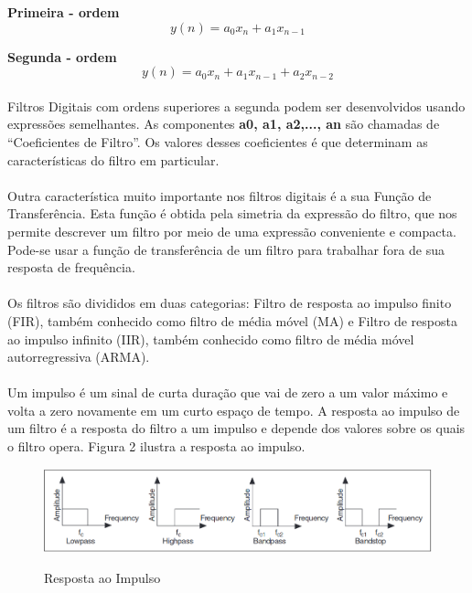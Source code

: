 \documentclass[12pt,fleqn]{article}
\begin{document}
\textbf{Primeira - ordem}
\begin{equation}
y(n) = a_0x_n + a_1x_{n-1}
\end{equation}

\textbf{Segunda - ordem}
\begin{equation}
y(n) = a_0x_n + a_1x_{n-1} + a_2x_{n-2}
\end{equation}

\paragraph{} Filtros Digitais com ordens superiores a segunda podem ser desenvolvidos usando expressões semelhantes. As componentes \textbf{a0, a1, a2,..., an} são chamadas de “Coeficientes de Filtro”. Os valores desses coeficientes é que determinam as características do filtro em particular.

\paragraph{} Outra característica muito importante nos filtros digitais é a sua Função de Transferência. Esta função é obtida pela simetria da expressão do filtro, que nos permite descrever um filtro por meio de uma expressão conveniente e compacta. Pode-se usar a função de transferência de um filtro para trabalhar fora de sua resposta de frequência.

\paragraph{} Os filtros são divididos em duas categorias: Filtro de resposta ao impulso finito (FIR), também conhecido como filtro de média móvel (MA) e Filtro de resposta ao impulso infinito (IIR), também conhecido como filtro de média móvel autorregressiva (ARMA). 
\paragraph{} Um impulso é um sinal de curta duração que vai de zero a um valor máximo e volta a zero novamente em um curto espaço de tempo. A resposta ao impulso de um filtro é a resposta do filtro a um impulso e depende dos valores sobre os quais o filtro opera. Figura 2 ilustra a resposta ao impulso.

\begin{figure}[!htb]
    \centering
    \includegraphics[scale=0.4]{fig/figura2.png}
    \label{figura:grafico}
    \caption{Resposta ao Impulso}
\end{figure}
\end{document}

